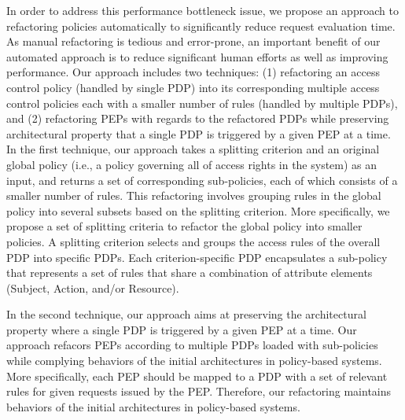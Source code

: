 In order to address this performance bottleneck issue,
we propose an approach to refactoring policies automatically to significantly reduce
request evaluation time.
As manual refactoring is tedious and
error-prone, an important benefit of our automated approach is to reduce significant human efforts as well as
improving performance.
Our approach includes two techniques: (1) refactoring an access control policy (handled by single PDP) into its corresponding multiple access
control policies each with a smaller number of rules (handled by multiple PDPs),
and (2) refactoring PEPs with regards to the refactored PDPs while preserving architectural property that a single PDP is triggered by a given PEP at a time.\\

In the first technique, our approach takes a splitting criterion and an original global policy (i.e., a policy governing all of access rights in the system) as an input, and returns a set of 
corresponding sub-policies, each of which consists of a smaller number of rules.
This refactoring involves grouping rules in the global policy  into several subsets based on the splitting criterion.
More specifically, we propose a set of splitting criteria to
refactor the global policy into smaller policies.
A splitting criterion selects and groups the access rules of the overall PDP into specific PDPs.
Each criterion-specific PDP encapsulates a sub-policy that represents a set of rules that share a combination
of attribute elements (Subject, Action, and/or Resource).

In the second technique, our approach aims at preserving the architectural property where a single PDP is triggered by a given PEP at a time.
Our approach refacors PEPs according to multiple PDPs loaded with sub-policies while complying behaviors of the initial architectures in policy-based systems. More specifically, each PEP should be mapped to a PDP with a set of relevant rules for given requests issued by the PEP.
Therefore, our refactoring maintains behaviors of the initial architectures in policy-based systems.
 





